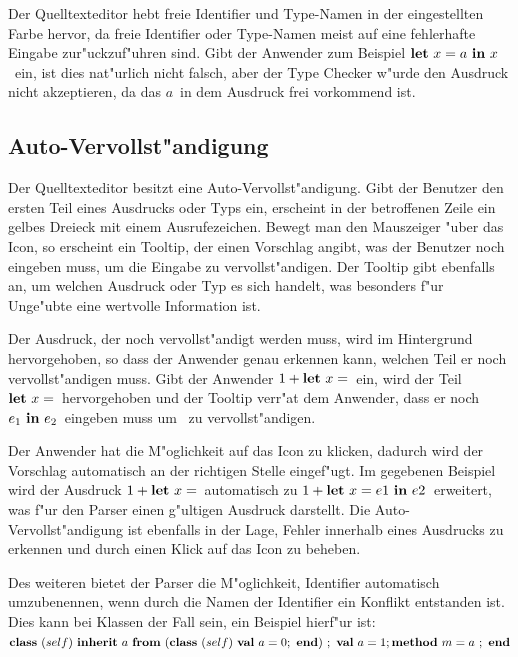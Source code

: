 Der Quelltexteditor hebt freie Identifier und Type-Namen in der eingestellten
Farbe hervor, da freie Identifier oder Type-Namen meist auf eine
fehlerhafte Eingabe zur"uckzuf"uhren sind. Gibt der Anwender zum Beispiel
\glqq$\bli{x}{a}{x}$\grqq\ ein, ist dies nat"urlich nicht falsch, aber
der Type Checker w"urde den Ausdruck nicht akzeptieren, da das 
\glqq$a$\grqq\ in dem Ausdruck frei vorkommend ist.

\subsection{Auto-Vervollst"andigung}
\label{Auto-Vervollstaendigung}
Der Quelltexteditor besitzt eine Auto-Vervollst"andigung. Gibt der Benutzer
den ersten Teil eines Ausdrucks oder Typs ein, erscheint in der betroffenen
Zeile ein gelbes Dreieck mit einem Ausrufezeichen. Bewegt man den Mauszeiger 
"uber das Icon, so erscheint ein Tooltip, der einen Vorschlag angibt, was der
Benutzer noch eingeben muss, um die Eingabe zu vervollst"andigen. Der
Tooltip gibt ebenfalls an, um welchen Ausdruck oder Typ es sich handelt, was
besonders f"ur Unge"ubte eine wertvolle Information ist.

Der Ausdruck, der noch vervollst"andigt werden muss, wird im Hintergrund
hervorgehoben, so dass der Anwender genau erkennen kann, welchen Teil er
noch vervollst"andigen muss. Gibt der Anwender \glqq$\infix{+}{1}{\blet\ x =}$\grqq\ 
ein, wird der Teil \glqq$\blet\ x =$\grqq\ hervorgehoben und der Tooltip
verr"at dem Anwender, dass er noch \glqq$e_1\ \bin\ e_2$\grqq\ eingeben muss
um \glqq{\bf Let}\grqq\ zu vervollst"andigen.

Der Anwender hat die M"oglichkeit auf das Icon zu klicken, dadurch wird der 
Vorschlag automatisch an der richtigen Stelle eingef"ugt. Im gegebenen Beispiel
wird der Ausdruck \glqq$\infix{+}{1}{\blet\ x =}$\grqq\ automatisch zu
\glqq$\infix{+}{1}{\bli{x}{e1}{e2}}$\grqq\ erweitert, was f"ur den Parser einen
g"ultigen Ausdruck darstellt. Die Auto-Vervollst"andigung ist ebenfalls in
der Lage, Fehler innerhalb eines Ausdrucks zu erkennen und durch einen Klick
auf das Icon zu beheben.

Des weiteren bietet der Parser die M"oglichkeit, Identifier automatisch
umzubenennen, wenn durch die Namen der Identifier ein Konflikt entstanden
ist. Dies kann bei Klassen der Fall sein, ein Beispiel hierf"ur ist:\\[2mm]
\glqq$\class{self}{\inherit{a}{(\class{self}{\val{a}{0}})}{\val{a}{1} \method{m}{a}}}$\grqq

